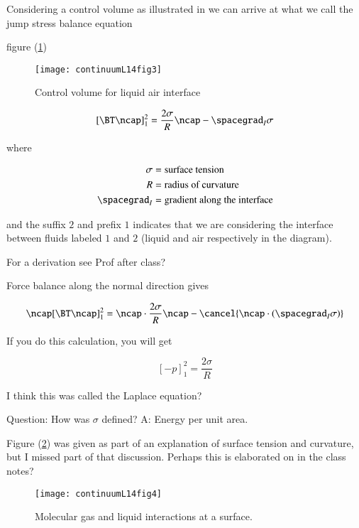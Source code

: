 Considering a control volume as illustrated in we can arrive at what we call the jump stress balance equation

figure (\ref{fig:continuumL14:continuumL14fig3})
\begin{figure}[htp]
   \centering
   \texttt{[image: continuumL14fig3]}
   \caption{Control volume for liquid air interface}\label{fig:continuumL14:continuumL14fig3}
\end{figure}

\begin{equation}\label{eqn:continuumL14:130}
[\BT \ncap]^2_1 = \frac{2 \sigma}{R} \ncap - \spacegrad_I \sigma
\end{equation}

where

\begin{align}\label{eqn:continuumL14:150}
\sigma &= \text{surface tension} \\
R &= \text{radius of curvature} \\
\spacegrad_I &= \text{gradient along the interface}
\end{align}

and the suffix $2$ and prefix $1$ indicates that we are considering the interface between fluids labeled $1$ and $2$ (liquid and air respectively in the diagram).

For a derivation see Prof after class?

Force balance along the normal direction gives

\begin{equation}\label{eqn:continuumL14:170}
\ncap [\BT \ncap]^2_1 = \ncap \cdot \frac{2 \sigma}{R} \ncap - \cancel{\ncap \cdot (\spacegrad_I \sigma)}
\end{equation}

If you do this calculation, you will get 

\begin{equation}\label{eqn:continuumL14:190}
[-p]^2_1 = \frac{ 2 \sigma}{R}
\end{equation}

I think this was called the Laplace equation?

Question: How was $\sigma$ defined?  A: Energy per unit area.  

Figure (\ref{fig:continuumL14:continuumL14fig4}) was given as part of an explanation of surface tension and curvature, but I missed part of that discussion.  Perhaps this is elaborated on in the class notes?

\begin{figure}[htp]
   \centering
   \texttt{[image: continuumL14fig4]}
   \caption{Molecular gas and liquid interactions at a surface.}\label{fig:continuumL14:continuumL14fig4}
\end{figure}

